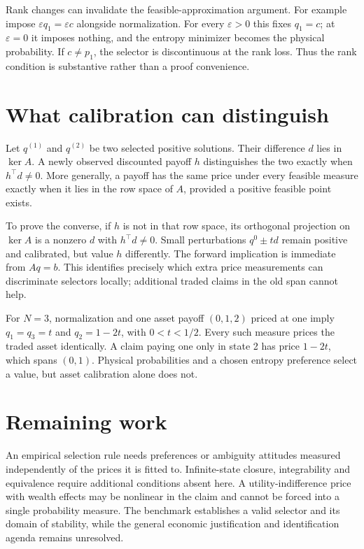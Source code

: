 \documentclass[11pt]{article}
\begin{document}
Rank changes can invalidate the feasible-approximation argument. For example impose $\varepsilon q_1=\varepsilon c$ alongside normalization. For every $\varepsilon>0$ this fixes $q_1=c$; at $\varepsilon=0$ it imposes nothing, and the entropy minimizer becomes the physical probability. If $c\ne p_1$, the selector is discontinuous at the rank loss. Thus the rank condition is substantive rather than a proof convenience.

\section*{What calibration can distinguish}
Let $q^{(1)}$ and $q^{(2)}$ be two selected positive solutions. Their difference $d$ lies in $\ker A$. A newly observed discounted payoff $h$ distinguishes the two exactly when $h^\top d\ne0$. More generally, a payoff has the same price under every feasible measure exactly when it lies in the row space of $A$, provided a positive feasible point exists.

To prove the converse, if $h$ is not in that row space, its orthogonal projection on $\ker A$ is a nonzero $d$ with $h^\top d\ne0$. Small perturbations $q^0\pm td$ remain positive and calibrated, but value $h$ differently. The forward implication is immediate from $Aq=b$. This identifies precisely which extra price measurements can discriminate selectors locally; additional traded claims in the old span cannot help.

For $N=3$, normalization and one asset payoff $(0,1,2)$ priced at one imply $q_1=q_3=t$ and $q_2=1-2t$, with $0<t<1/2$. Every such measure prices the traded asset identically. A claim paying one only in state 2 has price $1-2t$, which spans $(0,1)$. Physical probabilities and a chosen entropy preference select a value, but asset calibration alone does not.

\section*{Remaining work}
An empirical selection rule needs preferences or ambiguity attitudes measured independently of the prices it is fitted to. Infinite-state closure, integrability and equivalence require additional conditions absent here. A utility-indifference price with wealth effects may be nonlinear in the claim and cannot be forced into a single probability measure. The benchmark establishes a valid selector and its domain of stability, while the general economic justification and identification agenda remains unresolved.
\end{document}
